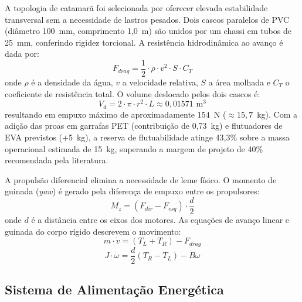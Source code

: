 \documentclass[12pt,a4paper]{article}
\begin{document}
A topologia de catamarã foi selecionada por oferecer elevada estabilidade transversal sem a necessidade de lastros pesados. Dois cascos paralelos de PVC (diâmetro 100~mm, comprimento 1{,}0~m) são unidos por um chassi em tubos de 25~mm, conferindo rigidez torcional. A resistência hidrodinâmica ao avanço é dada por:
\begin{equation}
F_{drag} = \frac{1}{2} \cdot \rho \cdot v^2 \cdot S \cdot C_{T}
\end{equation}
onde $\rho$ é a densidade da água, $v$ a velocidade relativa, $S$ a área molhada e $C_{T}$ o coeficiente de resistência total. O volume deslocado pelos dois cascos é:
\begin{equation}
V_d = 2 \cdot \pi \cdot r^2 \cdot L \approx 0{,}01571 \text{ m}^3
\end{equation}
resultando em empuxo máximo de aproximadamente $154$~N ($\approx 15{,}7$~kg). Com a adição das proas em garrafas PET (contribuição de 0,73~kg) e flutuadores de EVA previstos ($+$5~kg), a reserva de flutuabilidade atinge 43{,}3\% sobre a massa operacional estimada de 15~kg, superando a margem de projeto de 40\% recomendada pela literatura.

A propulsão diferencial elimina a necessidade de leme físico. O momento de guinada (\textit{yaw}) é gerado pela diferença de empuxo entre os propulsores:
\begin{equation}
M_z = (F_{dir} - F_{esq}) \cdot \frac{d}{2}
\end{equation}
onde $d$ é a distância entre os eixos dos motores. As equações de avanço linear e guinada do corpo rígido descrevem o movimento:
\begin{equation}
m \cdot \dot{v} = (T_L + T_R) - F_{drag}
\end{equation}
\begin{equation}
J \cdot \dot{\omega} = \frac{d}{2}(T_R - T_L) - B\omega
\end{equation}

\subsection{Sistema de Alimentação Energética}
\end{document}
